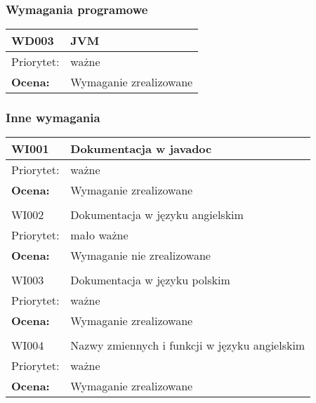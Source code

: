 \subsubsection{Wymagania programowe}


\begin{center}

\begin{tabular}{|m{3cm}|m{9cm}|} \hline

WD003 & JVM \\ \hline
Priorytet: & ważne \\ \hline
\textbf{Ocena:} & Wymaganie zrealizowane \\ \hline
\end{tabular}

\end{center}

\subsubsection{Inne wymagania}

\begin{center}

\begin{tabular}{|m{3cm}|m{9cm}|} \hline

WI001 & Dokumentacja w javadoc \\ \hline
Priorytet: & ważne \\ \hline
\textbf{Ocena:} & Wymaganie zrealizowane \\ \hline
\multicolumn{2}{c}{} \\
 \hline

WI002 & Dokumentacja w języku angielskim \\ \hline
Priorytet: & mało ważne \\ \hline
\textbf{Ocena:} & Wymaganie nie zrealizowane \\ \hline

\multicolumn{2}{c}{} \\
 \hline

WI003 & Dokumentacja w języku polskim \\ \hline
Priorytet: & ważne \\ \hline
\textbf{Ocena:} & Wymaganie zrealizowane \\ \hline

\multicolumn{2}{c}{} \\
 \hline
WI004 & Nazwy zmiennych i funkcji w języku angielskim \\ \hline
Priorytet: & ważne \\ \hline
\textbf{Ocena:} & Wymaganie zrealizowane \\ \hline

\end{tabular}

\end{center}

